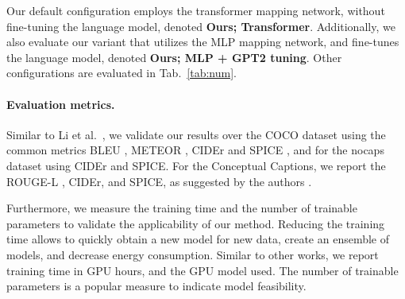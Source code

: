 Our default configuration employs the transformer mapping network, without fine-tuning the language model, denoted \textbf{Ours; Transformer}. Additionally, we also evaluate our variant that utilizes the MLP mapping network, and fine-tunes the language model, denoted \textbf{Ours; MLP + GPT2 tuning}. Other configurations are evaluated in Tab.~\ref{tab:num}.


\paragraph{Evaluation metrics.}
Similar to Li et al.~\cite{li2020oscar}, we validate our results over the COCO dataset using the common metrics BLEU \cite{papineni2002bleu}, METEOR \cite{denkowski2014meteor},  CIDEr \cite{vedantam2015cider} and SPICE \cite{anderson2016spice}, and for the nocaps dataset using CIDEr and SPICE. For the Conceptual Captions, we report the ROUGE-L \cite{lin2004automatic}, CIDEr, and SPICE, as suggested by the authors \cite{sharma2018conceptual}. 


Furthermore, we measure the training time and the number of trainable parameters to validate the applicability of our method.
Reducing the training time allows to quickly obtain a new model for new data, create an ensemble of models, and decrease energy consumption. Similar to other works, we report training time in GPU hours, and the GPU model used. The number of trainable parameters is a popular measure to indicate model feasibility. 














